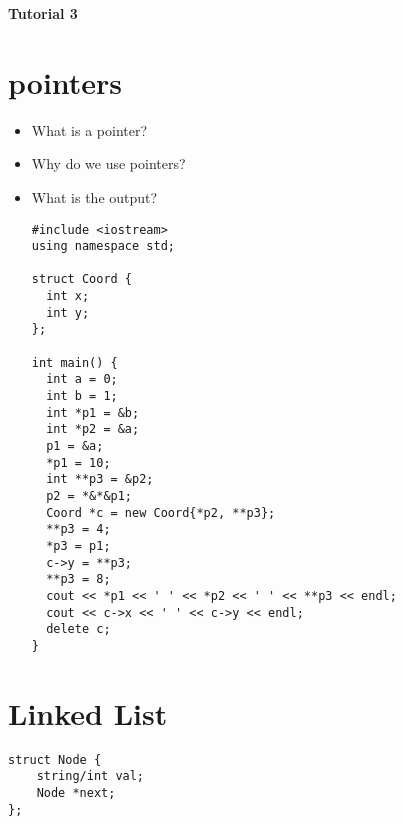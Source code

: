 \documentclass[12pt]{article}
\begin{document}
\begin{center}
    \textbf{\huge Tutorial 3}
\end{center}

\section{pointers}
\begin{itemize}
    \item What is a pointer?
    \item Why do we use pointers?
    \item What is the output?
    \begin{verbatim}
#include <iostream>
using namespace std;

struct Coord {
  int x;
  int y;
};

int main() {
  int a = 0;
  int b = 1;
  int *p1 = &b;
  int *p2 = &a;
  p1 = &a;
  *p1 = 10;
  int **p3 = &p2;
  p2 = *&*&p1;
  Coord *c = new Coord{*p2, **p3};
  **p3 = 4;
  *p3 = p1;
  c->y = **p3;
  **p3 = 8;
  cout << *p1 << ' ' << *p2 << ' ' << **p3 << endl;
  cout << c->x << ' ' << c->y << endl;
  delete c;
}
    \end{verbatim}
\end{itemize}

\section{Linked List}


\begin{verbatim}
struct Node {
    string/int val;
    Node *next;
};
\end{verbatim}
\end{document}
